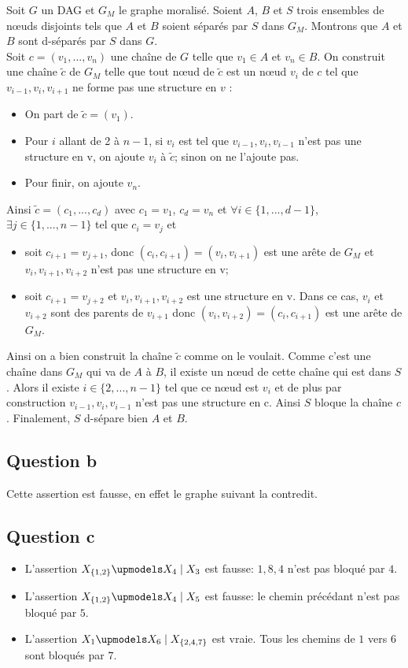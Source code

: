 \documentclass{article}
\begin{document}
Soit $G$ un DAG et $G_M$ le graphe moralisé. Soient $A$, $B$ et $S$ trois ensembles de nœuds disjoints tels que $A$ et $B$ soient séparés par $S$ dans $G_M$. Montrons que $A$ et $B$ sont d-séparés par $S$ dans $G$. \\
Soit $c = (v_{1}, ..., v_{n})$ une chaîne de $G$ telle que $v_{1} \in A$ et $v_{n} \in B$. On construit une chaîne $\tilde{c}$ de $G_M$ telle que tout nœud de $\tilde{c}$ est un nœud $v_i$ de $c$ tel que $v_{i-1},v_{i},v_{i+1}$ ne forme pas une structure en $v$ :
\begin{itemize}
\item On part de $\tilde{c}=(v_{1})$.
\item Pour  $i$ allant de 2 à $n-1$, si $v_i$ est tel que $v_{i-1},v_{i},v_{i-1}$ n'est pas une structure en v, on ajoute $v_i$ à $\tilde{c}$; sinon on ne l'ajoute pas.
\item Pour finir, on ajoute $v_{n}$. 
\end{itemize}
Ainsi $\tilde{c} = (c_{1}, ..., c_{d})$ avec $c_1 = v_1$, $c_d = v_n$ et $\forall i \in \{1,...,d-1\}$, $\exists j \in \{1,...,n-1\}$ tel que $c_i = v_j$ et 
\begin{itemize}
\item soit $c_{i+1} = v_{j+1}$, donc $(c_{i},c_{i+1})=(v_{i},v_{i+1})$ est une arête de $G_M$ et $v_{i},v_{i+1},v_{i+2}$ n'est pas une structure en v;
\item soit $c_{i+1} = v_{j+2}$ et $v_{i},v_{i+1},v_{i+2}$ est une structure en v. Dans ce cas, $v_{i}$ et $v_{i+2}$ sont des parents de $v_{i+1}$ donc $(v_{i},v_{i+2})=(c_{i},c_{i+1})$ est une arête de $G_M$.
\end{itemize}
Ainsi on a bien construit la chaîne $\tilde{c}$ comme on le voulait. Comme c'est une chaîne dans $G_M$ qui va de $A$ à $B$, il existe un nœud de cette chaîne qui est dans $S$. Alors il existe $i\in \{2,...,n-1\}$ tel que ce nœud est $v_i$ et de plus par construction $v_{i-1},v_{i},v_{i-1}$ n'est pas une structure en c. Ainsi $S$ bloque la chaîne $c$. Finalement, $S$ d-sépare bien $A$ et $B$.



\subsection{Question b}

Cette assertion est fausse, en effet le graphe suivant la contredit.



\subsection{Question c}

\begin{itemize}
\item L'assertion $X_{\{1, 2\}} \upmodels X_4 \mid X_3$ est fausse: ${1, 8, 4}$ n'est pas
bloqué par $4$.
\item L'assertion $X_{\{1, 2\}} \upmodels X_4 \mid X_5$ est fausse: le chemin précédant
n'est pas bloqué par $5$.
\item L'assertion $X_1 \upmodels X_6 \mid X_{\{2, 4, 7\}}$ est vraie. Tous les chemins
de $1$ vers $6$ sont bloqués par $7$.
\end{itemize}
\end{document}
